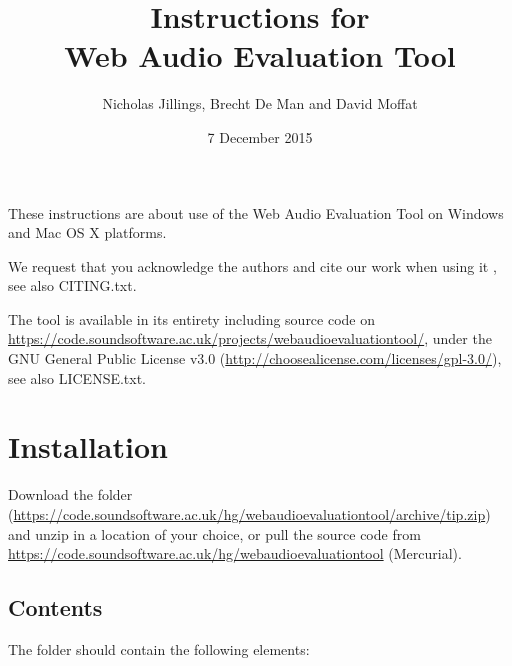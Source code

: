 \documentclass[11pt, oneside]{article}   	%
\title{Instructions for \\ Web Audio Evaluation Tool}
\author{Nicholas Jillings, Brecht De Man and David Moffat}
\date{7 December 2015}							%
\begin{document}
\maketitle

These instructions are about use of the Web Audio Evaluation Tool on Windows and Mac OS X platforms. 

We request that you acknowledge the authors and cite our work when using it \cite{waet}, see also CITING.txt. 

The tool is available in its entirety including source code on \url{https://code.soundsoftware.ac.uk/projects/webaudioevaluationtool/}, under the GNU General Public License v3.0 (\url{http://choosealicense.com/licenses/gpl-3.0/}), see also LICENSE.txt. 


\tableofcontents

\clearpage

\section{Installation}
	Download the folder (\url{https://code.soundsoftware.ac.uk/hg/webaudioevaluationtool/archive/tip.zip}) and unzip in a location of your choice, or pull the source code from \url{https://code.soundsoftware.ac.uk/hg/webaudioevaluationtool} (Mercurial). 
	
	\subsection{Contents}
		The folder should contain the following elements: \\
		
\end{document}
